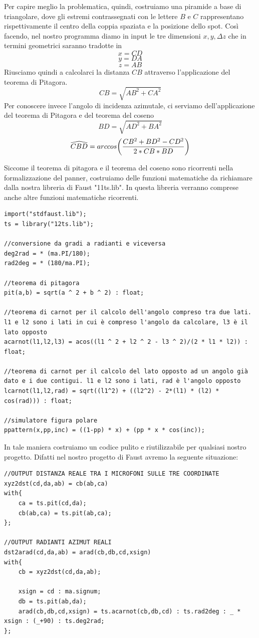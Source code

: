 \documentclass{article}
\begin{document}
    Per capire meglio la problematica, quindi, costruiamo una piramide a base di triangolare, dove gli estremi contrassegnati con le lettere $B$ e $C$ rappresentano rispettivamente il centro della coppia spaziata e la posizione dello spot. Così facendo, nel nostro programma diamo in input le tre dimensioni $x, y, \Delta z$ che in termini geometrici saranno tradotte in
    $$x = CD$$
    $$y = DA$$
    $$z = AB$$
    Riusciamo quindi a calcolarci la distanza $CB$ attraverso l'applicazione del teorema di Pitagora.
    $$CB = \sqrt{AB^2 + CA ^ 2}$$
    Per conoscere invece l'angolo di incidenza azimutale, ci serviamo dell'applicazione del teorema di Pitagora e del teorema del coseno
    $$BD = \sqrt{AD^2 + BA ^ 2}$$
    $$\widehat{CBD} = arccos \biggl( {CB ^ 2 + BD ^ 2 - CD ^ 2\over 2 * CB * BD} \biggr)$$

    Siccome il teorema di pitagora e il teorema del coseno sono ricorrenti nella formalizzazione del panner, costruiamo delle funzioni matematiche da richiamare dalla nostra libreria di Faust "11ts.lib". In questa libreria verranno comprese anche altre funzioni matematiche ricorrenti.
    
    \begin{lstlisting}
import("stdfaust.lib");
ts = library("12ts.lib");

//conversione da gradi a radianti e viceversa
deg2rad = * (ma.PI/180);
rad2deg = * (180/ma.PI);

//teorema di pitagora
pit(a,b) = sqrt(a ^ 2 + b ^ 2) : float;

//teorema di carnot per il calcolo dell'angolo compreso tra due lati. l1 e l2 sono i lati in cui è compreso l'angolo da calcolare, l3 è il lato opposto
acarnot(l1,l2,l3) = acos((l1 ^ 2 + l2 ^ 2 - l3 ^ 2)/(2 * l1 * l2)) : float;

//teorema di carnot per il calcolo del lato opposto ad un angolo già dato e i due contigui. l1 e l2 sono i lati, rad è l'angolo opposto
lcarnot(l1,l2,rad) = sqrt((l1^2) + ((l2^2) - 2*(l1) * (l2) * cos(rad))) : float;

//simulatore figura polare
ppattern(x,pp,inc) = ((1-pp) * x) + (pp * x * cos(inc));
    \end{lstlisting}
    
    
    In tale maniera costruiamo un codice pulito e riutilizzabile per qualsiasi nostro progetto.
    Difatti nel nostro progetto di Faust avremo la seguente situazione:
    
    \begin{lstlisting}
//OUTPUT DISTANZA REALE TRA I MICROFONI SULLE TRE COORDINATE
xyz2dst(cd,da,ab) = cb(ab,ca)
with{
    ca = ts.pit(cd,da);
    cb(ab,ca) = ts.pit(ab,ca);
};

//OUTPUT RADIANTI AZIMUT REALI
dst2arad(cd,da,ab) = arad(cb,db,cd,xsign)
with{
    cb = xyz2dst(cd,da,ab);

    xsign = cd : ma.signum;
    db = ts.pit(ab,da);
    arad(cb,db,cd,xsign) = ts.acarnot(cb,db,cd) : ts.rad2deg : _ * xsign : (_+90) : ts.deg2rad;
};
    \end{lstlisting}
\end{document}
